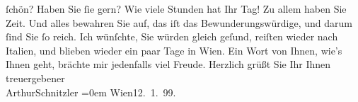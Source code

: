 \begin{ledgroupsized}[t]{13cm}
                    ſchön? Haben Sie ſie gern? Wie viele Stunden hat Ihr Tag! Zu allem haben Sie
                    Zeit. Und alles bewahren Sie auf, das iſt das Bewunderungswürdige, und darum {\pb}ſind Sie ſo reich.\pend
           \pstart
           Ich wünſchte, Sie würden gleich geſund, reiſten wieder nach Italien, und blieben wieder ein paar Tage in Wien. Ein Wort von Ihnen, wie’s Ihnen geht,
                    brächte mir jedenfalls viel Freude.\pend
           \pstart
           Herzlich grüßt Sie Ihr Ihnen {\\[\baselineskip]}treuergebener{\\[\baselineskip]}\spacefill\mbox{ArthurSchnitzler}\pend
           \leftskip=0em{}\pstart
           Wien12. 1. 99.\pend
           
         
         \endnumbering{}\end{ledgroupsized}  \newcommand{\dateiname}{L00880}\newcommand{\titel}{Arthur Schnitzler an Georg Brandes, 12. 1. 1899}\newcommand{\editorInnen}{Martin Anton Müller und Gerd-Hermann Susen}
      